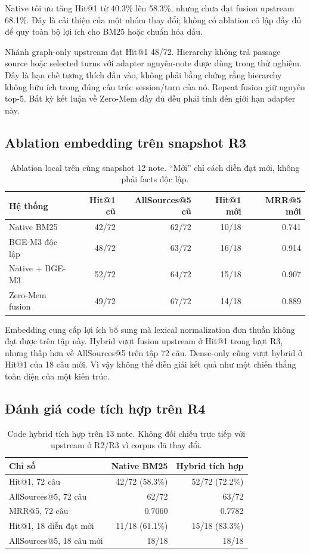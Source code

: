 \documentclass[11pt,a4paper]{article}
\begin{document}
Native tối ưu tăng Hit@1 từ 40.3\% lên 58.3\%, nhưng chưa đạt fusion upstream 68.1\%. Đây là cải thiện của một nhóm thay đổi; không có ablation cô lập đầy đủ để quy toàn bộ lợi ích cho BM25 hoặc chuẩn hóa dấu.

Nhánh graph-only upstream đạt Hit@1 48/72. Hierarchy không trả passage source hoặc selected turns với adapter nguyên-note được dùng trong thử nghiệm. Đây là hạn chế tương thích đầu vào, không phải bằng chứng rằng hierarchy không hữu ích trong đúng cấu trúc session/turn của nó. Repeat fusion giữ nguyên top-5. Bất kỳ kết luận về Zero-Mem đầy đủ đều phải tính đến giới hạn adapter này.

\subsection{Ablation embedding trên snapshot R3}
\begin{table}[ht]
\centering\small
\begin{tabular}{@{}lrrrr@{}}
\toprule
Hệ thống & Hit@1 cũ & AllSources@5 cũ & Hit@1 mới & MRR@5 mới \\
\midrule
Native BM25 & 42/72 & 62/72 & 10/18 & 0.741 \\
BGE-M3 độc lập & 48/72 & 63/72 & 16/18 & 0.914 \\
Native + BGE-M3 & 52/72 & 64/72 & 15/18 & 0.907 \\
Zero-Mem fusion & 49/72 & 67/72 & 14/18 & 0.889 \\
\bottomrule
\end{tabular}
\caption{Ablation local trên cùng snapshot 12 note. ``Mới'' chỉ cách diễn đạt mới, không phải facts độc lập.}
\end{table}

Embedding cung cấp lợi ích bổ sung mà lexical normalization đơn thuần không đạt được trên tập này. Hybrid vượt fusion upstream ở Hit@1 trong lượt R3, nhưng thấp hơn về AllSources@5 trên tập 72 câu. Dense-only cũng vượt hybrid ở Hit@1 của 18 câu mới. Vì vậy không thể diễn giải kết quả như một chiến thắng toàn diện của một kiến trúc.

\subsection{Đánh giá code tích hợp trên R4}
\begin{table}[ht]
\centering
\begin{tabular}{@{}lrr@{}}
\toprule
Chỉ số & Native BM25 & Hybrid tích hợp \\
\midrule
Hit@1, 72 câu & 42/72 (58.3\%) & 52/72 (72.2\%) \\
AllSources@5, 72 câu & 62/72 & 63/72 \\
MRR@5, 72 câu & 0.7060 & 0.7782 \\
Hit@1, 18 diễn đạt mới & 11/18 (61.1\%) & 15/18 (83.3\%) \\
AllSources@5, 18 câu mới & 18/18 & 18/18 \\
\bottomrule
\end{tabular}
\caption{Code hybrid tích hợp trên 13 note. Không đối chiếu trực tiếp với upstream ở R2/R3 vì corpus đã thay đổi.}
\end{table}
\end{document}
